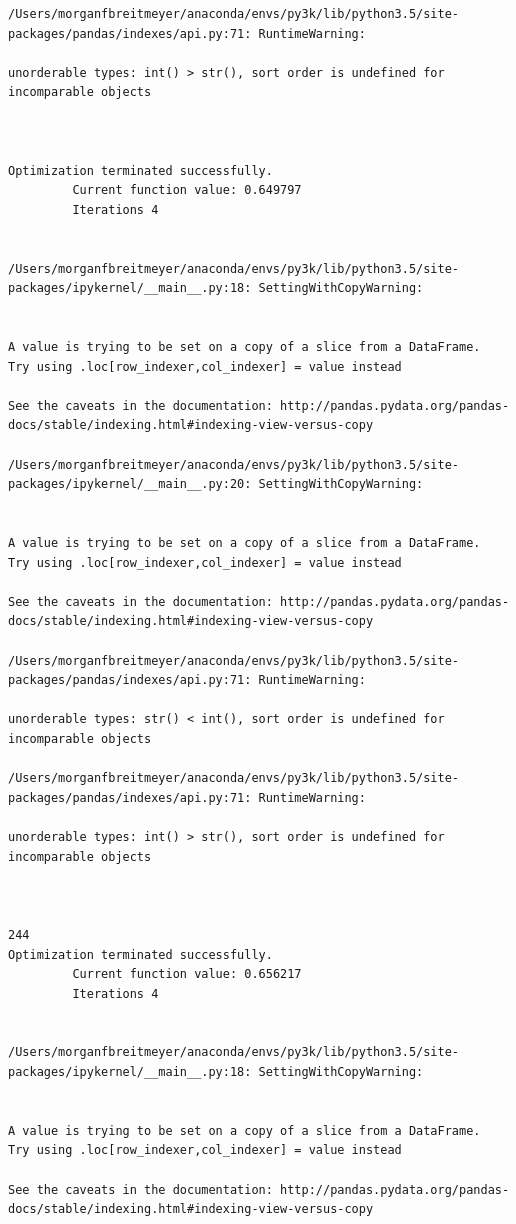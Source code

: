 \begin{lstlisting}
/Users/morganfbreitmeyer/anaconda/envs/py3k/lib/python3.5/site-packages/pandas/indexes/api.py:71: RuntimeWarning:

unorderable types: int() > str(), sort order is undefined for incomparable objects



Optimization terminated successfully.
         Current function value: 0.649797
         Iterations 4


/Users/morganfbreitmeyer/anaconda/envs/py3k/lib/python3.5/site-packages/ipykernel/__main__.py:18: SettingWithCopyWarning:


A value is trying to be set on a copy of a slice from a DataFrame.
Try using .loc[row_indexer,col_indexer] = value instead

See the caveats in the documentation: http://pandas.pydata.org/pandas-docs/stable/indexing.html#indexing-view-versus-copy

/Users/morganfbreitmeyer/anaconda/envs/py3k/lib/python3.5/site-packages/ipykernel/__main__.py:20: SettingWithCopyWarning:


A value is trying to be set on a copy of a slice from a DataFrame.
Try using .loc[row_indexer,col_indexer] = value instead

See the caveats in the documentation: http://pandas.pydata.org/pandas-docs/stable/indexing.html#indexing-view-versus-copy

/Users/morganfbreitmeyer/anaconda/envs/py3k/lib/python3.5/site-packages/pandas/indexes/api.py:71: RuntimeWarning:

unorderable types: str() < int(), sort order is undefined for incomparable objects

/Users/morganfbreitmeyer/anaconda/envs/py3k/lib/python3.5/site-packages/pandas/indexes/api.py:71: RuntimeWarning:

unorderable types: int() > str(), sort order is undefined for incomparable objects



244
Optimization terminated successfully.
         Current function value: 0.656217
         Iterations 4


/Users/morganfbreitmeyer/anaconda/envs/py3k/lib/python3.5/site-packages/ipykernel/__main__.py:18: SettingWithCopyWarning:


A value is trying to be set on a copy of a slice from a DataFrame.
Try using .loc[row_indexer,col_indexer] = value instead

See the caveats in the documentation: http://pandas.pydata.org/pandas-docs/stable/indexing.html#indexing-view-versus-copy


\end{lstlisting}
